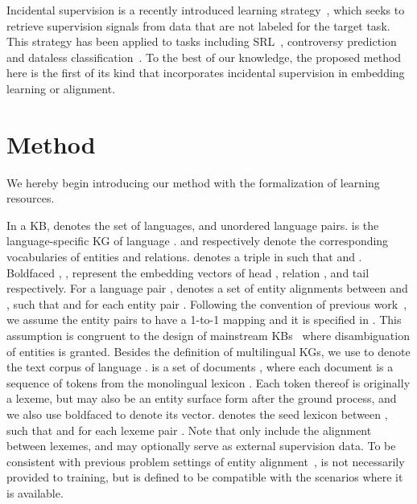 \documentclass[11pt,a4paper]{article}
\newcommand{\stitle}[1]{\vspace{2ex} \noindent{\bf #1}}
\begin{document}
\stitle{Incidental supervision.}
Incidental supervision is a recently introduced learning strategy~\cite{roth2017incidental},
which seeks to retrieve supervision signals from data that are not 
labeled for 
the target task.
This strategy has been applied to tasks including SRL~\cite{he2019incidental}, controversy prediction~\cite{rethmeier2018learning} and dataless classification~\cite{song2015unsupervised}.
To the best of our knowledge, the proposed method here is the first of its kind that incorporates incidental supervision in embedding learning or alignment.

 

\section{Method}

We hereby begin introducing our method with the formalization of learning resources.

In a \mbox{KB},  denotes the set of languages, and  unordered language pairs.
 is the language-specific KG of language .
 and  respectively denote the corresponding vocabularies of entities and relations.
 denotes a triple in  such that  and .
Boldfaced , , 
represent the embedding vectors of head , relation , and tail  respectively. For a language pair
,
 denotes a set of entity alignments 
between  and , such that  and  for each entity pair .
Following the convention of previous work~\cite{chen2018co,sun2018bootstrapping,yang2019aligning},
we assume the entity pairs to have a 1-to-1 mapping and it is specified in .
This assumption is congruent to the design of mainstream KBs~\cite{lehmann2015dbpedia,mahdisoltani2014yago3} where disambiguation of entities is granted.
Besides the definition of multilingual KGs, we use  to denote the text corpus of language .
 is a set of documents , where each document  is a sequence of tokens from the monolingual lexicon .
Each token  thereof is originally a lexeme, but may also be an entity surface form after the ground process, and we also use boldfaced  to denote its vector.
 denotes the seed lexicon between , such that  and  for each lexeme pair .
Note that  only include the alignment between lexemes, and may optionally serve as external supervision data.
To be consistent with previous problem settings of entity alignment~\cite{chen2017multigraph,sun2018bootstrapping,yang2019aligning},  is not necessarily provided to training, but is defined to be compatible with the scenarios where it is available. 
\end{document}
